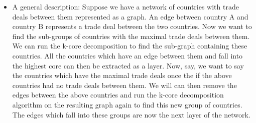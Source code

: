 \begin{itemize} 
\item{A general description:
Suppose we have a network of countries with trade deals between them represented as a graph. An edge between country A and country B represents a trade deal between the two countries. Now we want to find the sub-groups of countries with the maximal trade deals between them. We can run the k-core decomposition to find the sub-graph containing these countries. All the countries which have an edge between them and fall into the highest core can then be extracted as a layer. Now, say, we want to say the countries which have the maximal trade deals once the if the above countries had no trade deals between them. We will can then remove the edges between the above countries and run the k-core decomposition algorithm on the resulting graph again to find this new group of countries. The edges which fall into these groups are now the next layer of the network. 
} 


\end{itemize}
